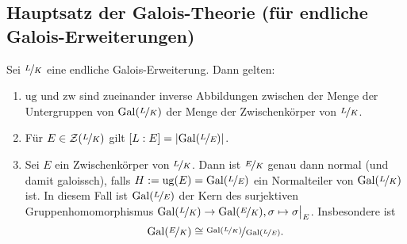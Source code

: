 \subsection{Hauptsatz der Galois-Theorie (für endliche Galois-Erweiterungen)} %
\label{sub:178}
Sei $\nicefrac{L}{K}$ eine endliche Galois-Erweiterung. Dann gelten: 
\begin{enumerate}[(1)]
	\item $\mathrm{ug}$ und $\mathrm{zw}$ sind zueinander inverse Abbildungen zwischen der Menge der Untergruppen von $\Gal(\nicefrac{L}{K})$ der Menge der Zwischenkörper
	von $\nicefrac{L}{K}$.
	\item Für $E \in \mathcal{Z}(\nicefrac{L}{K})$ gilt $[L:E]= \abs*{\Gal(\nicefrac{L}{E})}$.
	\item Sei $E$ ein Zwischenkörper von $\nicefrac{L}{K}$. Dann ist $\nicefrac{E}{K}$ genau dann normal (und damit galoissch), falls 
	$H:=\mathrm{ug}(E)= \Gal(\nicefrac{L}{E})$ ein Normalteiler von $\Gal(\nicefrac{L}{K})$ ist. In diesem Fall ist $\Gal(\nicefrac{L}{E})$ der Kern des surjektiven
	Gruppenhomomorphismus $\Gal(\nicefrac{L}{K}) \to \Gal(\nicefrac{E}{K}), \sigma \mapsto \sigma\big|_E$. Insbesondere ist 
	\[
		\Gal(\nicefrac{E}{K}) \cong \nicefrac{\Gal(\nicefrac{L}{K})}{\Gal(\nicefrac{L}{E})}.
	\]
\end{enumerate}
